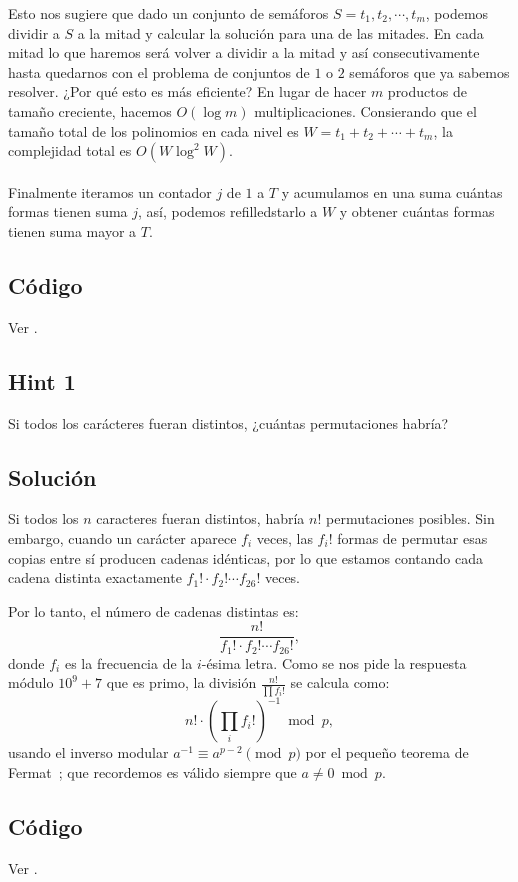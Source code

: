 Esto nos sugiere que dado un conjunto de semáforos $S={t_1,t_2,\cdots,t_m}$, podemos dividir a $S$ a la mitad y calcular la solución para una de las mitades. En cada mitad lo que haremos será volver a dividir a la mitad y así consecutivamente hasta quedarnos con el problema de conjuntos de $1$ o $2$ semáforos que ya sabemos resolver. ¿Por qué esto es más eficiente? En lugar de hacer $m$ productos de tamaño creciente, hacemos $O(\log m)$ multiplicaciones. Consierando que el tamaño total de los polinomios en cada nivel es $W=t_1+t_2+\cdots+t_m$, la complejidad total es $O( W \log^2 W)$.
\\\\
Finalmente iteramos un contador $j$ de $1$ a $T$ y acumulamos en una suma cuántas formas tienen suma $j$, así, podemos refilledstarlo a $W$ y obtener cuántas formas tienen suma mayor a $T$.
\subsection*{Código}
Ver .
 
\subsection*{Hint 1}
Si todos los carácteres fueran distintos, ¿cuántas permutaciones habría?
\subsection*{Solución}
Si todos los $n$ caracteres fueran distintos, habría $n!$ permutaciones posibles. Sin embargo, cuando un carácter aparece $f_i$ veces, las $f_i!$ formas de permutar esas copias entre sí producen cadenas idénticas, por lo que estamos contando cada cadena distinta exactamente $f_1!
\cdot f_2! \cdots f_{26}!$ veces.
 
Por lo tanto, el número de cadenas distintas es:
\[
\frac{n!}{f_1! \cdot f_2! \cdots f_{26}!},
\]
donde $f_i$ es la frecuencia de la $i$-ésima letra.
Como se nos pide la respuesta módulo $10^9+7$ que es primo, la división $\frac{n!}{\prod f_i!}$ se calcula como:
\[
n! \cdot \left(\prod_{i} f_i!\right)^{-1} \bmod p,
\]
usando el inverso modular $a^{-1} \equiv a^{p-2} \pmod{p}$ por el
pequeño teorema de Fermat~\cite{perez_numeros}; que recordemos es válido siempre que $a \neq 0 \bmod p$.
\subsection*{Código}
Ver .
 
